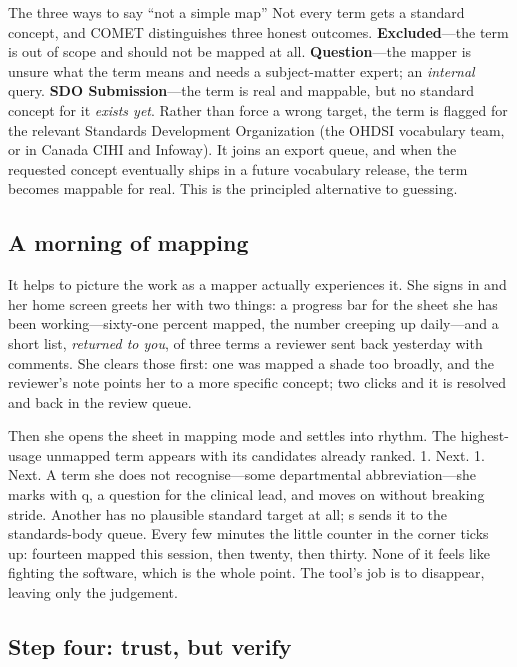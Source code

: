 \documentclass[12pt,openany]{book}
\newcommand{\code}[1]{{\ttfamily\small #1}}
\begin{document}
\begin{definition}{The three ways to say ``not a simple map''}
Not every term gets a standard concept, and COMET distinguishes three honest outcomes.
\textbf{Excluded}---the term is out of scope and should not be mapped at all. \textbf{Question}---the
mapper is unsure what the term means and needs a subject-matter expert; an \emph{internal} query.
\textbf{SDO Submission}---the term is real and mappable, but no standard concept for it \emph{exists
yet}. Rather than force a wrong target, the term is flagged for the relevant Standards Development
Organization (the OHDSI vocabulary team, or in Canada CIHI and Infoway). It joins an export queue, and
when the requested concept eventually ships in a future vocabulary release, the term becomes mappable
for real. This is the principled alternative to guessing.
\end{definition}

\subsection{A morning of mapping}

It helps to picture the work as a mapper actually experiences it. She signs in and her home screen
greets her with two things: a progress bar for the sheet she has been working---sixty-one percent
mapped, the number creeping up daily---and a short list, \emph{returned to you}, of three terms a
reviewer sent back yesterday with comments. She clears those first: one was mapped a shade too broadly,
and the reviewer's note points her to a more specific concept; two clicks and it is resolved and back
in the review queue.

Then she opens the sheet in mapping mode and settles into rhythm. The highest-usage unmapped term
appears with its candidates already ranked. \code{1}. Next. \code{1}. Next. A term she does not
recognise---some departmental abbreviation---she marks with \code{q}, a question for the clinical lead,
and moves on without breaking stride. Another has no plausible standard target at all; \code{s} sends
it to the standards-body queue. Every few minutes the little counter in the corner ticks up: fourteen
mapped this session, then twenty, then thirty. None of it feels like fighting the software, which is
the whole point. The tool's job is to disappear, leaving only the judgement.

\subsection{Step four: trust, but verify}
\end{document}
